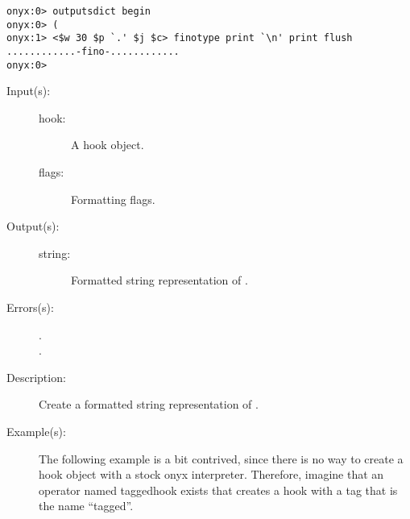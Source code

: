 \begin{description}
\begin{description}
\begin{verbatim}
onyx:0> outputsdict begin
onyx:0> (
onyx:1> <$w 30 $p `.' $j $c> finotype print `\n' print flush
............-fino-............
onyx:0>
		\end{verbatim}
	\end{description}
\label{outputsdict:hooktype}
\item[{\onyxop{hook flags}{hooktype}{string}}: ]
	\begin{description}\item[]
	\item[Input(s): ]
		\begin{description}\item[]
		\item[hook: ]
			A hook object.
		\item[flags: ]
			Formatting flags.
		\end{description}
	\item[Output(s): ]
		\begin{description}\item[]
		\item[string: ]
			Formatted string representation of .
		\end{description}
	\item[Errors(s): ]
		\begin{description}\item[]
		\item[.]
		\item[.]
		\end{description}
	\item[Description: ]
		Create a formatted string representation of .
	\item[Example(s): ]
		The following example is a bit contrived, since there is no way
		to create a hook object with a stock onyx interpreter.
		Therefore, imagine that an operator named taggedhook exists that
		creates a hook with a tag that is the name ``tagged''.
		\begin{verbatim}


\end{verbatim}
\end{description}
\end{description}
